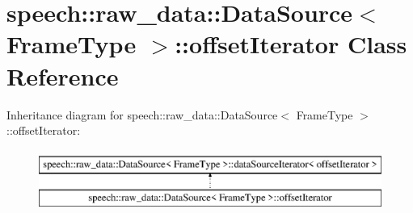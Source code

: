\hypertarget{classspeech_1_1raw__data_1_1DataSource_1_1offsetIterator}{\section{speech\+:\+:raw\+\_\+data\+:\+:Data\+Source$<$ Frame\+Type $>$\+:\+:offset\+Iterator Class Reference}
\label{classspeech_1_1raw__data_1_1DataSource_1_1offsetIterator}
}
Inheritance diagram for speech\+:\+:raw\+\_\+data\+:\+:Data\+Source$<$ Frame\+Type $>$\+:\+:offset\+Iterator\+:\begin{figure}[H]
\begin{center}
\leavevmode
\includegraphics[height=2.000000cm]{classspeech_1_1raw__data_1_1DataSource_1_1offsetIterator}
\end{center}
\end{figure}
